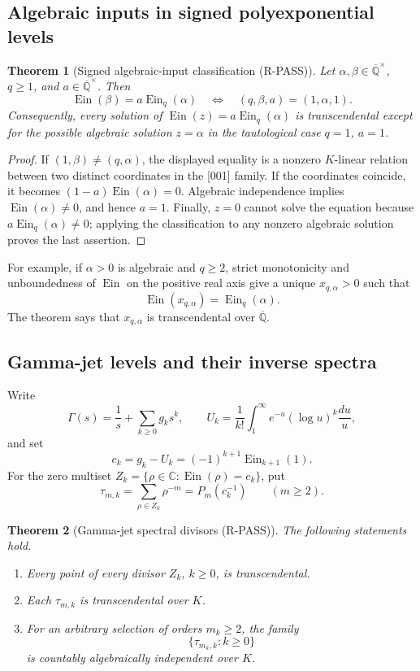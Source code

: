 \documentclass[11pt]{article}
\theoremstyle{keio}
\newtheorem{theorem}{Theorem}[section]
\theoremstyle{definition}
\theoremstyle{remark}
\newcommand{\Qbar}{\overline{\mathbb Q}}
\newcommand{\C}{\mathbb C}
\newcommand{\Ein}{\operatorname{Ein}}
\newcommand{\RPASS}{\textcolor{keioxblue}{\textsf{R-PASS}}}
\begin{document}
\subsection{Algebraic inputs in signed polyexponential levels}

\begin{theorem}[Signed algebraic-input classification (\RPASS)]
\label{thm:transfer-signed-classification}
Let \(\alpha,\beta\in\Qbar^\times\), \(q\ge1\), and
\(a\in\Qbar^\times\).  Then
\[
 \Ein(\beta)=a\Ein_q(\alpha)
 \quad\Longleftrightarrow\quad
 (q,\beta,a)=(1,\alpha,1).
\]
Consequently, every solution of
\(\Ein(z)=a\Ein_q(\alpha)\) is transcendental except for the possible
algebraic solution \(z=\alpha\) in the tautological case \(q=1\), \(a=1\).
\end{theorem}

\begin{proof}
If \((1,\beta)\ne(q,\alpha)\), the displayed equality is a nonzero
\(K\)-linear relation between two distinct coordinates in the [001]
family.  If the coordinates coincide, it becomes
\((1-a)\Ein(\alpha)=0\).  Algebraic independence implies
\(\Ein(\alpha)\ne0\), and hence \(a=1\).  Finally, \(z=0\) cannot solve
the equation because \(a\Ein_q(\alpha)\ne0\); applying the classification
to any nonzero algebraic solution proves the last assertion.
\end{proof}

For example, if \(\alpha>0\) is algebraic and \(q\ge2\), strict
monotonicity and unboundedness of \(\Ein\) on the positive real axis give
a unique \(x_{q,\alpha}>0\) such that
\[
 \Ein(x_{q,\alpha})=\Ein_q(\alpha).
\]
The theorem says that \(x_{q,\alpha}\) is transcendental over \(\Qbar\).

\subsection{Gamma-jet levels and their inverse spectra}

Write
\[
 \Gamma(s)=\frac1s+\sum_{k\ge0}g_ks^k,
 \qquad
 U_k=\frac1{k!}\int_1^\infty
 e^{-u}(\log u)^k\frac{du}{u},
\]
and set
\[
 c_k=g_k-U_k=(-1)^{k+1}\Ein_{k+1}(1).
\]
For the zero multiset
\(Z_k=\{\rho\in\C:\Ein(\rho)=c_k\}\), put
\[
 \tau_{m,k}=\sum_{\rho\in Z_k}\rho^{-m}=P_m(c_k^{-1})
 \qquad(m\ge2).
\]

\begin{theorem}[Gamma-jet spectral divisors (\RPASS)]
\label{thm:transfer-gamma-divisors}
The following statements hold.
\begin{enumerate}
\item Every point of every divisor \(Z_k\), \(k\ge0\), is
transcendental.
\item Each \(\tau_{m,k}\) is transcendental over \(K\).
\item For an arbitrary selection of orders \(m_k\ge2\), the family
\[
 \{\tau_{m_k,k}:k\ge0\}
\]
is countably algebraically independent over \(K\).
\end{enumerate}
\end{theorem}
\end{document}
